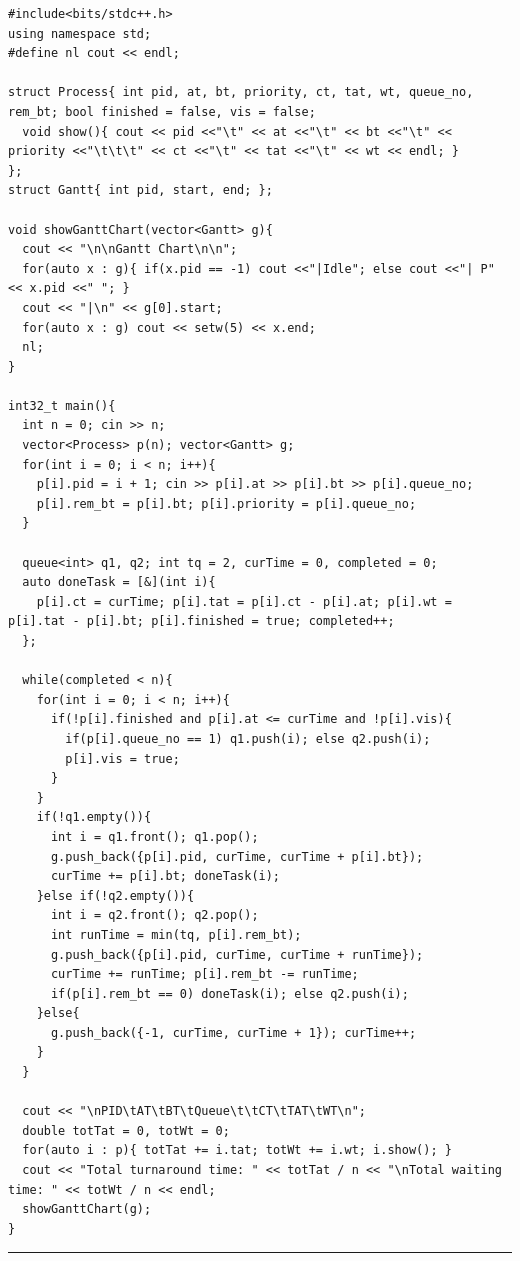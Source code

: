 \documentclass[10pt, a4paper]{article}
\begin{document}
\begin{lstlisting}
#include<bits/stdc++.h>
using namespace std;
#define nl cout << endl;

struct Process{ int pid, at, bt, priority, ct, tat, wt, queue_no, rem_bt; bool finished = false, vis = false;
  void show(){ cout << pid <<"\t" << at <<"\t" << bt <<"\t" << priority <<"\t\t\t" << ct <<"\t" << tat <<"\t" << wt << endl; }
};
struct Gantt{ int pid, start, end; };

void showGanttChart(vector<Gantt> g){
  cout << "\n\nGantt Chart\n\n";
  for(auto x : g){ if(x.pid == -1) cout <<"|Idle"; else cout <<"| P" << x.pid <<" "; }
  cout << "|\n" << g[0].start;
  for(auto x : g) cout << setw(5) << x.end;
  nl;
}

int32_t main(){
  int n = 0; cin >> n;
  vector<Process> p(n); vector<Gantt> g;
  for(int i = 0; i < n; i++){
    p[i].pid = i + 1; cin >> p[i].at >> p[i].bt >> p[i].queue_no;
    p[i].rem_bt = p[i].bt; p[i].priority = p[i].queue_no; 
  }

  queue<int> q1, q2; int tq = 2, curTime = 0, completed = 0;
  auto doneTask = [&](int i){
    p[i].ct = curTime; p[i].tat = p[i].ct - p[i].at; p[i].wt = p[i].tat - p[i].bt; p[i].finished = true; completed++;
  };

  while(completed < n){
    for(int i = 0; i < n; i++){
      if(!p[i].finished and p[i].at <= curTime and !p[i].vis){
        if(p[i].queue_no == 1) q1.push(i); else q2.push(i);
        p[i].vis = true;
      }
    }
    if(!q1.empty()){
      int i = q1.front(); q1.pop();
      g.push_back({p[i].pid, curTime, curTime + p[i].bt});
      curTime += p[i].bt; doneTask(i);
    }else if(!q2.empty()){
      int i = q2.front(); q2.pop();
      int runTime = min(tq, p[i].rem_bt);
      g.push_back({p[i].pid, curTime, curTime + runTime});
      curTime += runTime; p[i].rem_bt -= runTime;
      if(p[i].rem_bt == 0) doneTask(i); else q2.push(i);
    }else{
      g.push_back({-1, curTime, curTime + 1}); curTime++;
    }
  }
  
  cout << "\nPID\tAT\tBT\tQueue\t\tCT\tTAT\tWT\n";
  double totTat = 0, totWt = 0;
  for(auto i : p){ totTat += i.tat; totWt += i.wt; i.show(); }
  cout << "Total turnaround time: " << totTat / n << "\nTotal waiting time: " << totWt / n << endl;
  showGanttChart(g);
}
\end{lstlisting}
\vspace{1em}
\hrule
\vspace{1em}

\end{document}
